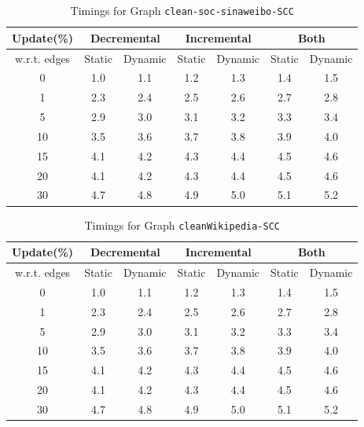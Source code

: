 \begin{table}[H]
    \centering
    \caption{Timings for Graph \texttt{clean-soc-sinaweibo-SCC} }
    \begin{tabular}{|c|c|c|c|c|c|c|}
        \hline
        \textbf{Update(\%)} & \multicolumn{2}{c|}{\textbf{Decremental}} & \multicolumn{2}{c|}{\textbf{Incremental}} & \multicolumn{2}{c|}{\textbf{Both}} \\
        \hline
        w.r.t. edges & Static &  Dynamic & Static & Dynamic & Static & Dynamic \\
        \hline
        0 & 1.0 & 1.1 & 1.2 & 1.3 & 1.4 & 1.5 \\
        1 & 2.3 & 2.4 & 2.5 & 2.6 & 2.7 & 2.8 \\
        5 & 2.9 & 3.0 & 3.1 & 3.2 & 3.3 & 3.4 \\
        10 & 3.5 & 3.6 & 3.7 & 3.8 & 3.9 & 4.0 \\
        15 & 4.1 & 4.2 & 4.3 & 4.4 & 4.5 & 4.6 \\
        20 & 4.1 & 4.2 & 4.3 & 4.4 & 4.5 & 4.6 \\
        30 & 4.7 & 4.8 & 4.9 & 5.0 & 5.1 & 5.2 \\
        \hline
    \end{tabular}
    \label{tab:timed_results_g2}
\end{table}

\begin{table}[H]
    \centering
    \caption{Timings for Graph \texttt{cleanWikipedia-SCC} }
    \begin{tabular}{|c|c|c|c|c|c|c|}
        \hline
        \textbf{Update(\%)} & \multicolumn{2}{c|}{\textbf{Decremental}} & \multicolumn{2}{c|}{\textbf{Incremental}} & \multicolumn{2}{c|}{\textbf{Both}} \\
        \hline
        w.r.t. edges & Static &  Dynamic & Static & Dynamic & Static & Dynamic \\
        \hline
        0 & 1.0 & 1.1 & 1.2 & 1.3 & 1.4 & 1.5 \\
        1 & 2.3 & 2.4 & 2.5 & 2.6 & 2.7 & 2.8 \\
        5 & 2.9 & 3.0 & 3.1 & 3.2 & 3.3 & 3.4 \\
        10 & 3.5 & 3.6 & 3.7 & 3.8 & 3.9 & 4.0 \\
        15 & 4.1 & 4.2 & 4.3 & 4.4 & 4.5 & 4.6 \\
        20 & 4.1 & 4.2 & 4.3 & 4.4 & 4.5 & 4.6 \\
        30 & 4.7 & 4.8 & 4.9 & 5.0 & 5.1 & 5.2 \\
        \hline
    \end{tabular}
    \label{tab:timed_results_g3}
\end{table}



